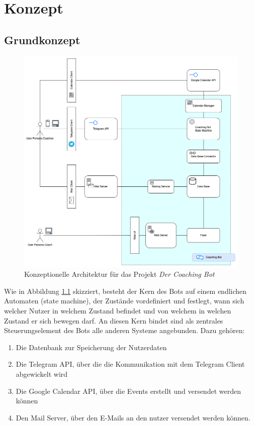 \label{Konzept}
\chapter{Konzept}

\section{Grundkonzept}

	\begin{figure} %
		\centering
		\includegraphics[width=1.0\textwidth]{images/220320_PA28464_Architecture.png}
		\caption{Konzeptionelle Architektur für das Projekt \emph{Der Coaching Bot}}
		\label{fig: architecture}
	\end{figure}

	Wie in Abbildung \ref{fig: architecture} skizziert, besteht der Kern des Bots auf einem endlichen Automaten (state machine), der Zustände vordefiniert und festlegt, wann sich welcher Nutzer in welchem Zustand befindet und von welchem in welchen Zustand er sich bewegen darf. An diesen Kern bindet sind als zentrales Steuerungselement des Bots alle anderen Systeme angebunden. Dazu gehören:
	\begin{enumerate}
		\item Die Datenbank zur Speicherung der Nutzerdaten
		\item Die Telegram API, über die die Kommunikation mit dem Telegram Client abgewickelt wird
		\item Die Google Calendar API, über die Events erstellt und versendet werden können
		\item Den Mail Server, über den E-Mails an den nutzer versendet werden können.
	\end{enumerate} 

